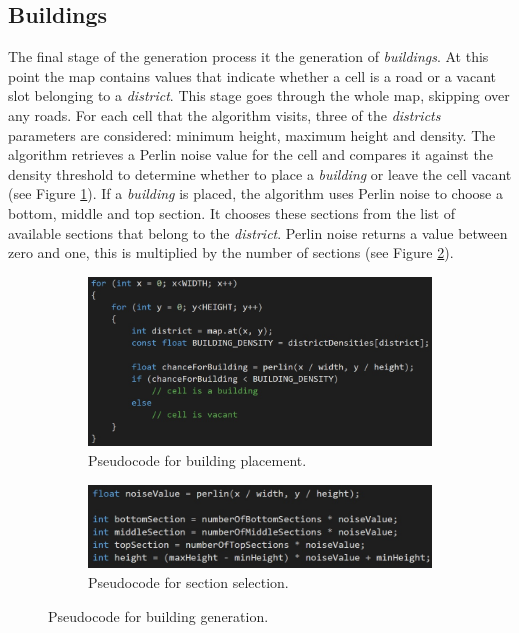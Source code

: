 	\subsection{Buildings}
		The final stage of the generation process it the generation of \textit{buildings}. At this point the map contains values that indicate whether a cell is a road or a vacant slot belonging to a \textit{district}. This stage goes through the whole map, skipping over any roads. For each cell that the algorithm visits, three of the \textit{districts} parameters are considered: minimum height, maximum height and density. The algorithm retrieves a Perlin noise value for the cell and compares it against the density threshold to determine whether to place a \textit{building} or leave the cell vacant (see Figure \ref{fig:vacant-code}). If a \textit{building} is placed, the algorithm uses Perlin noise to choose a bottom, middle and top section. It chooses these sections from the list of available sections that belong to the \textit{district}. Perlin noise returns a value between zero and one, this is multiplied by the number of sections (see Figure \ref{fig:section-code}).
		
	\begin{figure}[h]
		\begin{subfigure}{0.5\textwidth}
			\centering
			\includegraphics[width=0.95\linewidth]{"Images/vacant code"}
			\caption{Pseudocode for building placement.}
			\label{fig:vacant-code}
		\end{subfigure}
		\begin{subfigure}{0.5\textwidth}
			\centering
			\includegraphics[width=0.95\linewidth]{"Images/section code"}
			\caption{Pseudocode for section selection.}
			\label{fig:section-code}
		\end{subfigure}
			\caption{Pseudocode for building generation.}
			\label{fig:pseudo-code-buildings}
	\end{figure}
		
